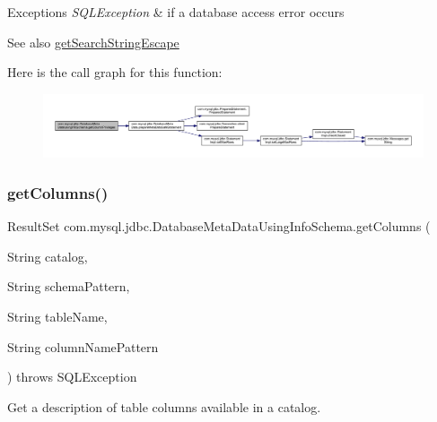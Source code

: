 \begin{DoxyExceptions}{Exceptions}
{\em S\+Q\+L\+Exception} & if a database access error occurs \\
\hline
\end{DoxyExceptions}
\begin{DoxySeeAlso}{See also}
\mbox{\hyperlink{classcom_1_1mysql_1_1jdbc_1_1_database_meta_data_a210b7942557a965c3af550074bb6fe9d}{get\+Search\+String\+Escape}} 
\end{DoxySeeAlso}
Here is the call graph for this function\+:
\nopagebreak
\begin{figure}[H]
\begin{center}
\leavevmode
\includegraphics[width=350pt]{classcom_1_1mysql_1_1jdbc_1_1_database_meta_data_using_info_schema_a21958250d37526385b0bfc7e0699c6bf_cgraph}
\end{center}
\end{figure}
\mbox{\label{classcom_1_1mysql_1_1jdbc_1_1_database_meta_data_using_info_schema_a32e04e3285884390a2cfd25bfb1fc544}} 
\subsubsection{\texorpdfstring{get\+Columns()}{getColumns()}}
{\footnotesize\ttfamily Result\+Set com.\+mysql.\+jdbc.\+Database\+Meta\+Data\+Using\+Info\+Schema.\+get\+Columns (\begin{DoxyParamCaption}\item[{String}]{catalog,  }\item[{String}]{schema\+Pattern,  }\item[{String}]{table\+Name,  }\item[{String}]{column\+Name\+Pattern }\end{DoxyParamCaption}) throws S\+Q\+L\+Exception}

Get a description of table columns available in a catalog. 

